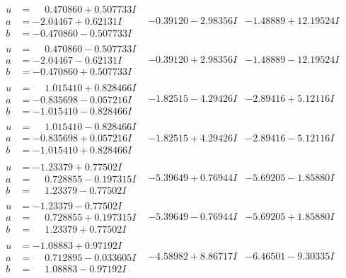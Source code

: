 \documentclass[1p]{elsarticle_modified}
\theoremstyle{definition}
\begin{document}
$$\begin{array}{c|c|c}
\begin{aligned}
u &= \phantom{-}0.470860 + 0.507733 I \\
a &= -2.04467 + 0.62131 I \\
b &= -0.470860 - 0.507733 I\end{aligned}
 & -0.39120 - 2.98356 I & -1.48889 + 12.19524 I \\ \hline\begin{aligned}
u &= \phantom{-}0.470860 - 0.507733 I \\
a &= -2.04467 - 0.62131 I \\
b &= -0.470860 + 0.507733 I\end{aligned}
 & -0.39120 + 2.98356 I & -1.48889 - 12.19524 I \\ \hline\begin{aligned}
u &= \phantom{-}1.015410 + 0.828466 I \\
a &= -0.835698 - 0.057216 I \\
b &= -1.015410 - 0.828466 I\end{aligned}
 & -1.82515 - 4.29426 I & -2.89416 + 5.12116 I \\ \hline\begin{aligned}
u &= \phantom{-}1.015410 - 0.828466 I \\
a &= -0.835698 + 0.057216 I \\
b &= -1.015410 + 0.828466 I\end{aligned}
 & -1.82515 + 4.29426 I & -2.89416 - 5.12116 I \\ \hline\begin{aligned}
u &= -1.23379 + 0.77502 I \\
a &= \phantom{-}0.728855 - 0.197315 I \\
b &= \phantom{-}1.23379 - 0.77502 I\end{aligned}
 & -5.39649 + 0.76944 I & -5.69205 - 1.85880 I \\ \hline\begin{aligned}
u &= -1.23379 - 0.77502 I \\
a &= \phantom{-}0.728855 + 0.197315 I \\
b &= \phantom{-}1.23379 + 0.77502 I\end{aligned}
 & -5.39649 - 0.76944 I & -5.69205 + 1.85880 I \\ \hline\begin{aligned}
u &= -1.08883 + 0.97192 I \\
a &= \phantom{-}0.712895 - 0.033605 I \\
b &= \phantom{-}1.08883 - 0.97192 I\end{aligned}
 & -4.58982 + 8.86717 I & -6.46501 - 9.30335 I \\ \hline\begin{aligned}

\end{aligned}
\end{array}$$
\end{document}
